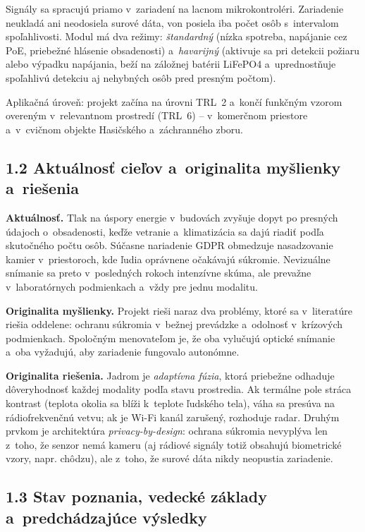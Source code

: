 \documentclass[11pt,a4paper]{article}
\begin{document}
Signály sa spracujú priamo v~zariadení na lacnom mikrokontroléri. Zariadenie neukladá ani neodosiela surové dáta, von posiela iba počet osôb s~intervalom spoľahlivosti. Modul má dva režimy: \emph{štandardný} (nízka spotreba, napájanie cez PoE, priebežné hlásenie obsadenosti) a~\emph{havarijný} (aktivuje sa pri detekcii požiaru alebo výpadku napájania, beží na záložnej batérii LiFePO4 a~uprednostňuje spoľahlivú detekciu aj nehybných osôb pred presným počtom).

Aplikačná úroveň: projekt začína na úrovni TRL~2 a~končí funkčným vzorom overeným v~relevantnom prostredí (TRL~6) -- v~komerčnom priestore a~v~cvičnom objekte Hasičského a~záchranného zboru.

\subsection*{1.2 Aktuálnosť cieľov a~originalita myšlienky a~riešenia}

\textbf{Aktuálnosť.} Tlak na úspory energie v~budovách zvyšuje dopyt po presných údajoch o~obsadenosti, keďže vetranie a~klimatizácia sa dajú riadiť podľa skutočného počtu osôb. Súčasne nariadenie GDPR obmedzuje nasadzovanie kamier v~priestoroch, kde ľudia oprávnene očakávajú súkromie. Nevizuálne snímanie sa preto v~posledných rokoch intenzívne skúma, ale prevažne v~laboratórnych podmienkach a~vždy pre jednu modalitu.

\textbf{Originalita myšlienky.} Projekt rieši naraz dva problémy, ktoré sa v~literatúre riešia oddelene: ochranu súkromia v~bežnej prevádzke a~odolnosť v~krízových podmienkach. Spoločným menovateľom je, že oba vylučujú optické snímanie a~oba vyžadujú, aby zariadenie fungovalo autonómne.

\textbf{Originalita riešenia.} Jadrom je \emph{adaptívna fúzia}, ktorá priebežne odhaduje dôveryhodnosť každej modality podľa stavu prostredia. Ak termálne pole stráca kontrast (teplota okolia sa blíži k~teplote ľudského tela), váha sa presúva na rádiofrekvenčnú vetvu; ak je Wi-Fi kanál zarušený, rozhoduje radar. Druhým prvkom je architektúra \emph{privacy-by-design}: ochrana súkromia nevyplýva len z~toho, že senzor nemá kameru (aj rádiové signály totiž obsahujú biometrické vzory, napr. chôdzu), ale z~toho, že surové dáta nikdy neopustia zariadenie.

\subsection*{1.3 Stav poznania, vedecké základy a~predchádzajúce výsledky}
\end{document}
